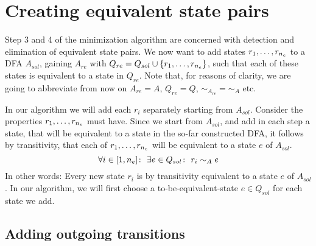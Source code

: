 \section{Creating equivalent state pairs}

Step 3 and 4 of the minimization algorithm are concerned with detection and elimination of equivalent state pairs. We now want to add states $r_1,\ldots,r_{n_e}$ to a DFA $A_{sol}$, gaining $A_{re}$ with $Q_{re} = Q_{sol} \cup \{r_1,\ldots,r_{n_e}\}$, such that each of these states is equivalent to a state in $Q_{re}$. Note that, for reasons of clarity, we are going to abbreviate from now on $A_{re} = A$, $Q_{re} = Q$, $\sim_{A_{re}} = \sim_A$ etc.

In our algorithm we will add each $r_i$ separately starting from $A_{sol}$. Consider the properties $r_1,\ldots,r_{n_e}$ must have. Since we start from $A_{sol}$, and add in each step a state, that will be equivalent to a state in the so-far constructed DFA, it follows by transitivity, that each of $r_1,\ldots,r_{n_e}$ will be equivalent to a state $e$ of $A_{sol}$.
\[
	\forall i \in [1,{n_e}] \colon\ \exists e \in Q_{sol}\colon\ r_i \sim_A e
\]
In other words: Every new state $r_i$ is by transitivity equivalent to a state $e$ of $A_{sol}$. In our algorithm, we will first choose a to-be-equivalent-state $e\in Q_{sol}$ for each state we add.

\subsection{Adding outgoing transitions}

